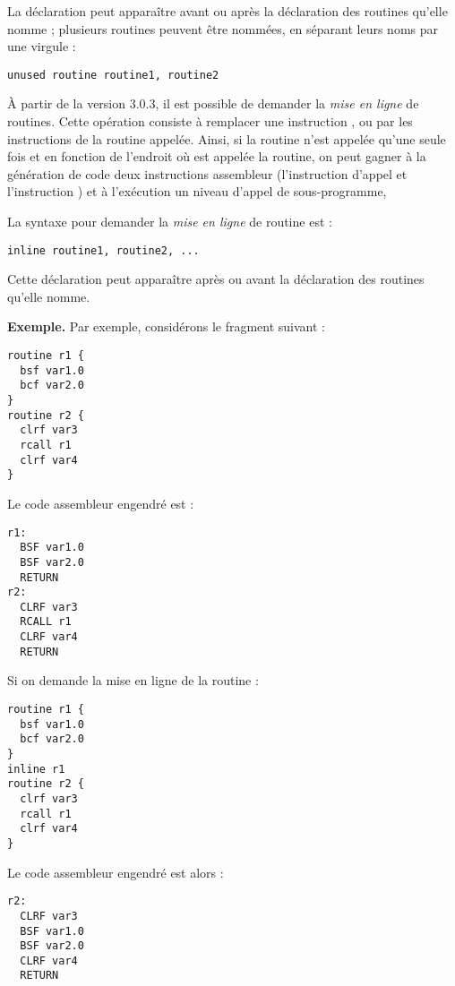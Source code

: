 La déclaration  peut apparaître avant ou après la déclaration des routines qu'elle nomme ; plusieurs routines peuvent être nommées, en séparant leurs noms par une virgule :
\begin{lstlisting}[language=piccolo]
unused routine routine1, routine2
\end{lstlisting}







À partir de la version 3.0.3, il est possible de demander la \emph{mise en ligne} de routines. Cette opération consiste à remplacer une instruction ,  ou  par les instructions de la routine appelée. Ainsi, si la routine n'est appelée qu'une seule fois et en fonction de l'endroit où est appelée la routine, on peut gagner à la génération de code deux instructions assembleur (l'instruction d'appel et l'instruction ) et à l'exécution un niveau d'appel de sous-programme, 

La syntaxe pour demander la \emph{mise en ligne} de routine est :
\begin{lstlisting}[language=piccolo]
inline routine1, routine2, ...
\end{lstlisting}

Cette déclaration peut apparaître après ou avant la déclaration des routines qu'elle nomme.

\textbf{Exemple.} Par exemple, considérons le fragment suivant :
\begin{lstlisting}[language=piccolo]
routine r1 {
  bsf var1.0
  bcf var2.0
}
routine r2 {
  clrf var3
  rcall r1
  clrf var4
}
\end{lstlisting}

Le code assembleur engendré est :
\begin{lstlisting}[language=assembleur]
r1:
  BSF var1.0
  BSF var2.0
  RETURN
r2:
  CLRF var3
  RCALL r1
  CLRF var4
  RETURN
\end{lstlisting}


Si on demande la mise en ligne de la routine  :
\begin{lstlisting}[language=piccolo]
routine r1 {
  bsf var1.0
  bcf var2.0
}
inline r1
routine r2 {
  clrf var3
  rcall r1
  clrf var4
}
\end{lstlisting}

Le code assembleur engendré est alors :
\begin{lstlisting}[language=assembleur]
r2:
  CLRF var3
  BSF var1.0
  BSF var2.0
  CLRF var4
  RETURN
\end{lstlisting}

